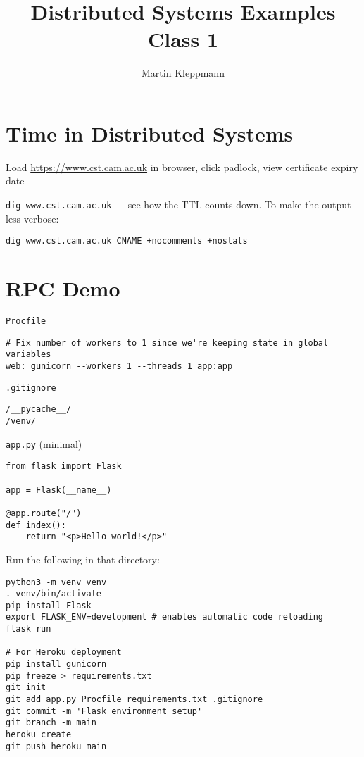 \documentclass{article}
\begin{document}
\title{Distributed Systems Examples Class 1}
\author{Martin Kleppmann}
\date{}
\maketitle

\section{Time in Distributed Systems}

Load \url{https://www.cst.cam.ac.uk} in browser, click padlock, view certificate expiry date

\texttt{dig www.cst.cam.ac.uk} --- see how the TTL counts down. To make the output less verbose:
\begin{verbatim}
dig www.cst.cam.ac.uk CNAME +nocomments +nostats
\end{verbatim}

\section{RPC Demo}

\texttt{Procfile}
\begin{verbatim}
# Fix number of workers to 1 since we're keeping state in global variables
web: gunicorn --workers 1 --threads 1 app:app
\end{verbatim}

\texttt{.gitignore}
\begin{verbatim}
/__pycache__/
/venv/
\end{verbatim}

\texttt{app.py} (minimal)
\begin{verbatim}
from flask import Flask

app = Flask(__name__)

@app.route("/")
def index():
    return "<p>Hello world!</p>"
\end{verbatim}

Run the following in that directory:

\begin{verbatim}
python3 -m venv venv
. venv/bin/activate
pip install Flask
export FLASK_ENV=development # enables automatic code reloading
flask run

# For Heroku deployment
pip install gunicorn
pip freeze > requirements.txt
git init
git add app.py Procfile requirements.txt .gitignore
git commit -m 'Flask environment setup'
git branch -m main
heroku create
git push heroku main
\end{verbatim}
\end{document}
